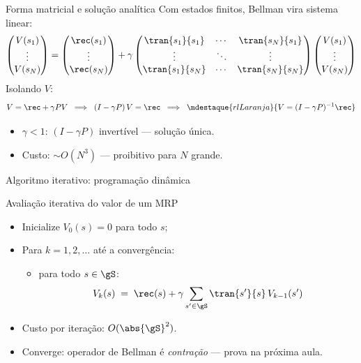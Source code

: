 \documentclass[aspectratio=169, 11pt]{beamer}
\begin{document}
\begin{frame}{Forma matricial e solução analítica}
  Com estados finitos, Bellman vira sistema linear:
  \[
    \begin{pmatrix} V(s_1) \\ \vdots \\ V(s_N) \end{pmatrix}
    =
    \begin{pmatrix} \rec(s_1) \\ \vdots \\ \rec(s_N) \end{pmatrix}
    + \gamma
    \begin{pmatrix}
      \tran{s_1}{s_1} & \cdots & \tran{s_N}{s_1} \\
      \vdots          & \ddots & \vdots          \\
      \tran{s_1}{s_N} & \cdots & \tran{s_N}{s_N}
    \end{pmatrix}
    \begin{pmatrix} V(s_1) \\ \vdots \\ V(s_N) \end{pmatrix}
  \]
  Isolando $V$:
  \[
    V = \rec + \gamma P V
    \;\;\Longrightarrow\;\;
    (I - \gamma P)\, V = \rec
    \;\;\Longrightarrow\;\;
    \mdestaque{rlLaranja}{V = (I - \gamma P)^{-1} \rec}
  \]

  \begin{itemize}
    \item $\gamma < 1$: $(I - \gamma P)$ invertível — solução única.
    \item Custo: $\sim O(N^3)$ — proibitivo para $N$ grande.
  \end{itemize}
\end{frame}

\begin{frame}{Algoritmo iterativo: programação dinâmica}
  \begin{algbox}{Avaliação iterativa do valor de um MRP}
    \begin{itemize}
      \item Inicialize $V_0(s) = 0$ para todo $s$;
      \item Para $k = 1, 2, \ldots$ até a convergência:
        \begin{itemize}
          \item para todo $s \in \gS$:
            \[
              V_k(s) \;=\; \rec(s)
                + \gamma \sum_{s' \in \gS} \tran{s'}{s}\, V_{k-1}(s')
            \]
        \end{itemize}
    \end{itemize}
  \end{algbox}

  \begin{itemize}
    \item Custo por iteração: $O(\abs{\gS}^2)$.
    \item Converge: operador de Bellman é \emph{contração} — prova na próxima aula.
  \end{itemize}
\end{frame}
\end{document}
